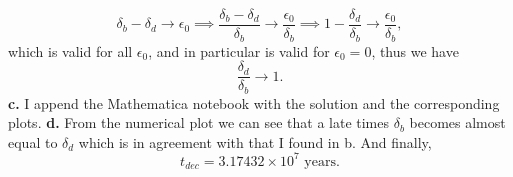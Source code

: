 \documentclass[11pt]{article}
\begin{document}
\begin{problem}
\begin{displaymath}
 \delta_b-\delta_d\rightarrow\epsilon_0\implies \frac{\delta_b-\delta_d}{\delta_b}\rightarrow\frac{\epsilon_0}{\delta_b}\implies 1-\frac{\delta_d}{\delta_b}\rightarrow\frac{\epsilon_0}{\delta_b},
\end{displaymath}
which is valid for all $\epsilon_0$, and in particular is valid for $\epsilon_0=0$, thus we have
\begin{displaymath}
  \frac{\delta_d}{\delta_b}\rightarrow 1.
\end{displaymath}
\newline
\textbf{c.} I append the Mathematica notebook with the solution and the corresponding plots.
\newline
\textbf{d.} From the numerical plot we can see that a late times $\delta_{b}$ becomes almost equal to $\delta_{d}$ which is in agreement with that I found in b. And finally, 
\begin{displaymath}
  t_{dec} = 3.17432\times10^7\text{ years}.
\end{displaymath}

\end{problem}
\newpage
\end{document}
